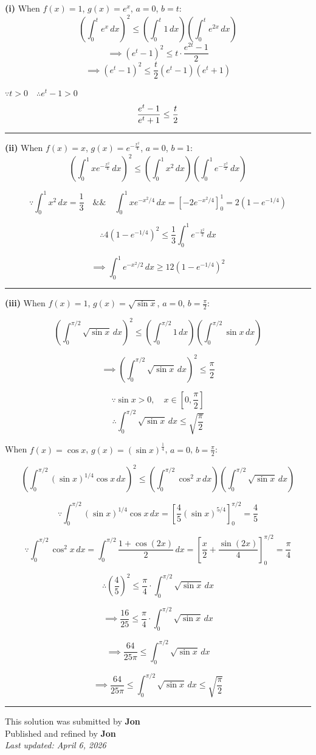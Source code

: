 ﻿\documentclass[12pt]{article}
\begin{document}
\textbf{(i)} When $f(x)=1$, $g(x)=e^x$, $a=0$, $b=t$:
$$\displaystyle \left( \int_0^t e^x\,dx \right)^2\le \left( \int_0^t 1\,dx \right)\left( \int_0^t e^{2x}\,dx \right)$$
$$\implies (e^t-1)^2\le t\cdot \frac{e^{2t}-1}{2}$$
$$\implies (e^t-1)^2\le \frac{t}{2}(e^t-1)(e^t+1)$$

$\because t>0\quad\therefore e^t-1>0$
$$\frac{e^t-1}{e^t+1}\le \frac{t}{2}\\$$



\bigskip\hrule\bigskip
\textbf{(ii)} When $f(x)=x$, $g(x)=e^{-\frac{x^2}{4}}$, $a=0$, $b=1$:
$$\displaystyle \left( \int_0^1 xe^{-\frac{x^2}{4}}\,dx \right)^2\le
\left( \int_0^1 x^2\,dx \right)\left( \int_0^1 e^{-\frac{x^2}{2}}\,dx \right)$$

$$ \because \int_0^1 x^2\,dx=\frac13\quad\&\&\quad
\int_0^1 xe^{-x^2/4}\,dx=\left[-2e^{-x^2/4}\right]_0^1=2(1-e^{-1/4})$$

$$\therefore 4(1-e^{-1/4})^2\le \frac13\int_0^1 e^{-\frac{x^2}{2}}\,dx $$

$$\implies \int_0^1 e^{-x^2/2}\,dx\ge 12(1-e^{-1/4})^2$$



\bigskip\hrule\bigskip
\textbf{(iii)} When $f(x)=1$, $g(x)=\sqrt{\sin x}$, $a=0$, $b=\frac{\pi}{2}$:

$$\displaystyle \left( \int_0^{\pi/2} \sqrt{\sin x}\,dx \right)^2\le \left( \int_0^{\pi/2} 1\,dx \right)\left( \int_0^{\pi/2} \sin x\,dx \right)$$

$$\implies \left( \int_0^{\pi/2} \sqrt{\sin x}\,dx \right)^2\le \frac{\pi}{2}$$

$$\because \sin x>0,\quad x \in [0,\frac{\pi}{2}]$$
$$\therefore \int_0^{\pi/2} \sqrt{\sin x}\,dx\le \sqrt{\frac{\pi}{2}}$$


When $f(x)=\cos x$, $g(x)=(\sin x)^\frac{1}{4}$, $a=0$, $b=\frac{\pi}{2}$:

$$\displaystyle \left( \int_0^{\pi/2} (\sin x)^{1/4} \cos x\,dx \right)^2\le \left( \int_0^{\pi/2} \cos^2 x\,dx \right)\left( \int_0^{\pi/2} \sqrt{\sin x}\,dx \right)$$

$$\because \int_0^{\pi/2} (\sin x)^{1/4} \cos x\,dx = \left[ \frac{4}{5}(\sin x)^{5/4} \right]_0^{\pi/2} = \frac{4}{5}$$

$$\because \int_0^{\pi/2} \cos^2 x\,dx = \int_0^{\pi/2} \frac{1+\cos(2x)}{2}\,dx = \left[ \frac{x}{2} + \frac{\sin(2x)}{4} \right]_0^{\pi/2} = \frac{\pi}{4}$$


$$\therefore \left( \frac{4}{5} \right)^2 \le \frac{\pi}{4} \cdot \int_0^{\pi/2} \sqrt{\sin x}\,dx$$

$$\implies \frac{16}{25} \le \frac{\pi}{4} \cdot \int_0^{\pi/2} \sqrt{\sin x}\,dx$$

$$\implies \frac{64}{25\pi} \le \int_0^{\pi/2} \sqrt{\sin x}\,dx$$

$$\implies \frac{64}{25\pi} \le \int_0^{\pi/2} \sqrt{\sin x}\,dx \le \sqrt{\frac{\pi}{2}}$$


\bigskip
\hrule
\begin{center}
	This solution was submitted by \textbf{Jon}\\[4pt]
	Published and refined by \textbf{Jon}\\[8pt]
	\textit{Last updated: April 6, 2026}
\end{center}
	
\end{document}
